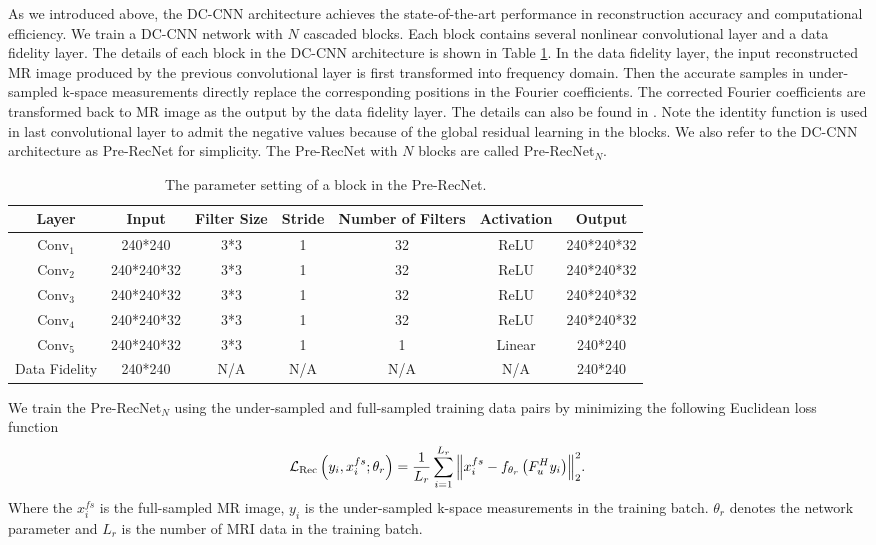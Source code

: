 \documentclass[runningheads]{llncs}
\begin{document}
As we introduced above, the DC-CNN architecture achieves the state-of-the-art performance in reconstruction accuracy and computational efficiency. We train a DC-CNN network with $N$ cascaded blocks. Each block contains several nonlinear convolutional layer and a data fidelity layer. The details of each block in the DC-CNN architecture is shown in Table \ref{RecNet}. In the data fidelity layer, the input reconstructed MR image produced by the previous convolutional layer is first transformed into frequency domain. Then the accurate samples in under-sampled k-space measurements directly replace the corresponding positions in the Fourier coefficients. The corrected Fourier coefficients are transformed back to MR image as the output by the data fidelity layer. The details can also be found in \cite{4}. Note the identity function is used in last convolutional layer to admit the negative values because of the global residual learning in the blocks. We also refer to the DC-CNN architecture as Pre-RecNet for simplicity. The Pre-RecNet with $N$ blocks are called Pre-RecNet$_N$.
\begin{table}[]
\centering
\caption{The parameter setting of a block in the Pre-RecNet.}
\label{RecNet}
\begin{tabular}{|c|c|c|c|c|c|c|}
\hline
Layer         & Input      & Filter Size & Stride & Number of Filters & Activation & Output     \\ \hline
Conv$_1$         & 240*240    & 3*3         & 1      & 32                & ReLU       & 240*240*32 \\ \hline
Conv$_2$         & 240*240*32 & 3*3         & 1      & 32                & ReLU       & 240*240*32 \\ \hline
Conv$_3$         & 240*240*32 & 3*3         & 1      & 32                & ReLU       & 240*240*32 \\ \hline
Conv$_4$         & 240*240*32 & 3*3         & 1      & 32                & ReLU       & 240*240*32 \\ \hline
Conv$_5$         & 240*240*32 & 3*3         & 1      & 1                 & Linear     & 240*240    \\ \hline
Data Fidelity & 240*240    & N/A         & N/A    & N/A               & N/A        & 240*240    \\ \hline
\end{tabular}
\end{table}
We train the Pre-RecNet$_N$ using the under-sampled and full-sampled training data pairs by minimizing the following Euclidean loss function
\begin{equation}\label{eq2}
{\cal L_{{\rm{Rec}}}}\left( {{y_i},x_i^{fs};{\theta _r}} \right) = \frac{1}{{{L_r}}}\sum\limits_{i = 1}^{{L_r}} {\left\| {x_i^{fs} - {f_{{\theta _r}}}\left( {F_u^H{y_i}} \right)} \right\|_2^2}.
\end{equation}
Where the ${x_i^{fs}}$ is the full-sampled MR image, $y_i$ is the under-sampled k-space measurements in the training batch. ${\theta _r}$ denotes the network parameter and $L_r$ is the number of MRI data in the training batch.
\end{document}
